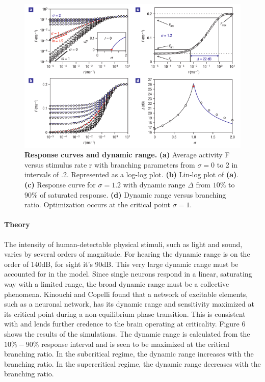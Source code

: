 \documentclass[12pt]{article}
\begin{document}
\begin{figure}      
  \begin{center}    
 \includegraphics[width=.65\textwidth]{dynamicrangetheorycopelli}    
    \caption{\textbf{Response curves and dynamic range.} \textbf{(a)} Average activity F versus stimulus rate r with branching parameters from $\sigma = 0$ to 2 in intervals of .2. Represented as a log-log plot. \textbf{(b)} Lin-log plot of \textbf{(a)}. \textbf{(c)} Response curve for $\sigma = 1.2$ with dynamic range $\Delta$ from $10\%$ to $90\%$ of saturated response. \textbf{(d)} Dynamic range versus branching ratio. Optimization occurs at the critical point $\sigma = 1$.\cite{Kinouchi2006b}}   
   \label{Figure::Dynamic Range Theory}   
  \end{center}     
   \end{figure}
   
\paragraph{Theory}
The intensity of human-detectable physical stimuli, such as light and sound, varies by several orders of magnitude. For hearing the dynamic range is on the order of 140dB, for sight it's 90dB. This very large dynamic range must be accounted for in the model. Since single neurons respond in a linear, saturating way with a limited range, the broad dynamic range must be a collective phenomena. Kinouchi and Copelli found that a network of excitable elements, such as a neuronal network, has its dynamic range and sensitivity maximized at its critical point during a non-equilibrium phase transition\cite{Kinouchi2006b}. This is consistent with and lends further credence to the brain operating at criticality. Figure 6 shows the results of the simulations. The dynamic range is calculated from the $10\%-90\%$ response interval and is seen to be maximized at the critical branching ratio. In the subcritical regime, the dynamic range increases with the branching ratio. In the supercritical regime, the dynamic range decreases with the branching ratio. \cite{Larremore2011a, Larremore2012a}
\end{document}
